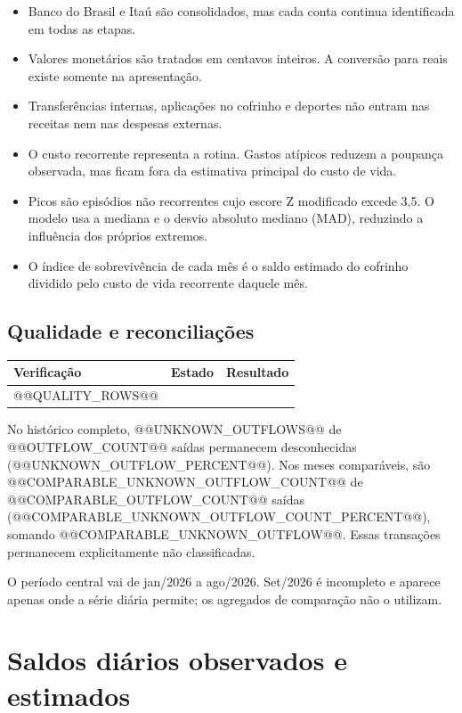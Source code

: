 \documentclass[11pt,a4paper]{article}
\newcommand{\Callout}[1]{%
  \colorbox{PaleOrange}{%
    \begin{minipage}{0.925\textwidth}
      \vspace{2mm}\small #1\vspace{2mm}
    \end{minipage}%
  }\par%
}
\begin{document}
\begin{itemize}
  \item Banco do Brasil e Itaú são consolidados, mas cada conta continua identificada em todas as etapas.
  \item Valores monetários são tratados em centavos inteiros. A conversão para reais existe somente na apresentação.
  \item Transferências internas, aplicações no cofrinho e deportes não entram nas receitas nem nas despesas externas.
  \item O custo recorrente representa a rotina. Gastos atípicos reduzem a poupança observada, mas ficam fora da estimativa principal do custo de vida.
  \item Picos são episódios não recorrentes cujo escore Z modificado excede 3,5. O modelo usa a mediana e o desvio absoluto mediano (MAD), reduzindo a influência dos próprios extremos.
  \item O índice de sobrevivência de cada mês é o saldo estimado do cofrinho dividido pelo custo de vida recorrente daquele mês.
\end{itemize}

\subsection{Qualidade e reconciliações}

\begin{longtable}{@{}>{\raggedright\arraybackslash}p{}>{\raggedright\arraybackslash}p{}>{\raggedright\arraybackslash}p{}@{}}
\toprule
\textbf{Verificação} & \textbf{Estado} & \textbf{Resultado} \\
\midrule
\endhead
@@QUALITY_ROWS@@
\bottomrule
\end{longtable}

No histórico completo, @@UNKNOWN_OUTFLOWS@@ de @@OUTFLOW_COUNT@@ saídas permanecem desconhecidas (@@UNKNOWN_OUTFLOW_PERCENT@@). Nos meses comparáveis, são @@COMPARABLE_UNKNOWN_OUTFLOW_COUNT@@ de @@COMPARABLE_OUTFLOW_COUNT@@ saídas (@@COMPARABLE_UNKNOWN_OUTFLOW_COUNT_PERCENT@@), somando @@COMPARABLE_UNKNOWN_OUTFLOW@@. Essas transações permanecem explicitamente não classificadas.

\Callout{O período central vai de jan/2026 a ago/2026. Set/2026 é incompleto e aparece apenas onde a série diária permite; os agregados de comparação não o utilizam.}

\clearpage
\section{Saldos diários observados e estimados}
\end{document}
